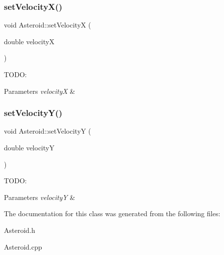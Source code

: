 \subsubsection{\texorpdfstring{set\+Velocity\+X()}{setVelocityX()}}
{\footnotesize\ttfamily void Asteroid\+::set\+VelocityX (\begin{DoxyParamCaption}\item[{double}]{velocityX }\end{DoxyParamCaption})}

T\+O\+DO\+: 
\begin{DoxyParams}{Parameters}
{\em velocityX} & \\
\hline
\end{DoxyParams}
\mbox{\label{class_asteroid_a0e915ddddb72eaa3f10f638cd1e567f2}} 
\subsubsection{\texorpdfstring{set\+Velocity\+Y()}{setVelocityY()}}
{\footnotesize\ttfamily void Asteroid\+::set\+VelocityY (\begin{DoxyParamCaption}\item[{double}]{velocityY }\end{DoxyParamCaption})}

T\+O\+DO\+: 
\begin{DoxyParams}{Parameters}
{\em velocityY} & \\
\hline
\end{DoxyParams}


The documentation for this class was generated from the following files\+:\begin{DoxyCompactItemize}
\item 
Asteroid.\+h\item 
Asteroid.\+cpp\end{DoxyCompactItemize}
